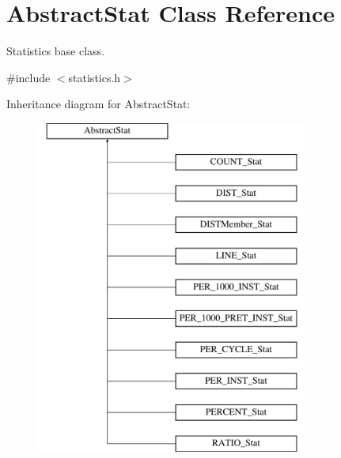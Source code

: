 \hypertarget{classAbstractStat}{
\section{AbstractStat Class Reference}
\label{classAbstractStat}
}


Statistics base class.  




{\ttfamily \#include $<$statistics.h$>$}

Inheritance diagram for AbstractStat:\begin{figure}[H]
\begin{center}
\leavevmode
\includegraphics[height=11.000000cm]{classAbstractStat}
\end{center}
\end{figure}
